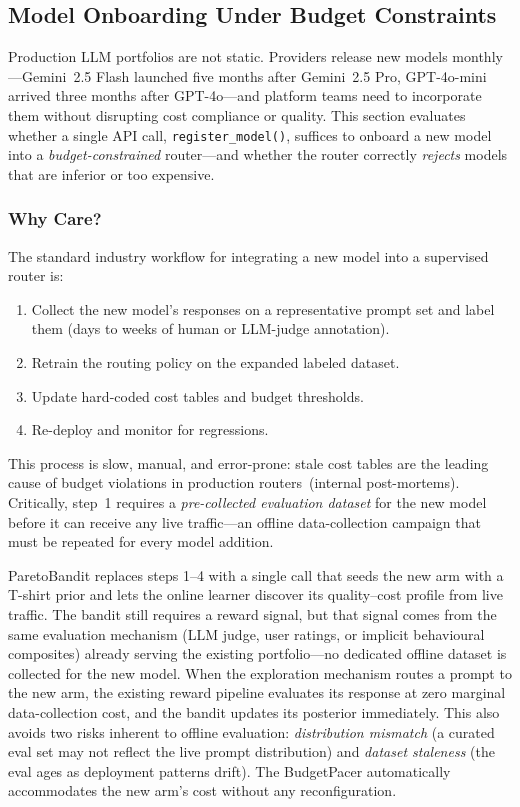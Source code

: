 
\subsection{Model Onboarding Under Budget Constraints}
\label{appendix:model_onboarding}

Production LLM portfolios are not static.
Providers release new models monthly---Gemini~2.5 Flash launched five
months after Gemini~2.5 Pro, GPT-4o-mini arrived three months after
GPT-4o---and platform teams need to incorporate them without
disrupting cost compliance or quality.
This section evaluates whether a single API call,
\texttt{register\_model()}, suffices to onboard a new model into a
\emph{budget-constrained} router---and whether the router correctly
\emph{rejects} models that are inferior or too expensive.

\subsubsection{Why Care?}

The standard industry workflow for integrating a new model into a
supervised router is:
\begin{enumerate}[nosep,leftmargin=*]
  \item Collect the new model's responses on a representative prompt
    set and label them (days to weeks of human or LLM-judge
    annotation).
  \item Retrain the routing policy on the expanded labeled dataset.
  \item Update hard-coded cost tables and budget thresholds.
  \item Re-deploy and monitor for regressions.
\end{enumerate}
This process is slow, manual, and error-prone: stale cost tables
are the leading cause of budget violations in production
routers~(internal post-mortems).
Critically, step~1 requires a \emph{pre-collected evaluation dataset}
for the new model before it can receive any live traffic---an
offline data-collection campaign that must be repeated for every
model addition.

ParetoBandit replaces steps 1--4 with a single call that seeds the new
arm with a T-shirt prior and lets the online learner discover its
quality--cost profile from live traffic.
The bandit still requires a reward signal, but that signal comes
from the same evaluation mechanism (LLM judge, user ratings, or
implicit behavioural composites) already serving the existing
portfolio---no dedicated offline dataset is collected for the new
model.
When the exploration mechanism routes a prompt to the new arm, the
existing reward pipeline evaluates its response at zero marginal
data-collection cost, and the bandit updates its posterior
immediately.
This also avoids two risks inherent to offline evaluation:
\emph{distribution mismatch} (a curated eval set may not reflect the
live prompt distribution) and \emph{dataset staleness} (the eval ages
as deployment patterns drift).
The BudgetPacer automatically accommodates the new arm's cost
without any reconfiguration.

